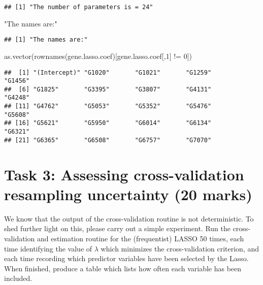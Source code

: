 \documentclass[
]{article}
\newenvironment{Shaded}{\begin{snugshade}}{\end{snugshade}}
\newcommand{\DecValTok}[1]{\textcolor[rgb]{0.00,0.00,0.81}{#1}}
\newcommand{\FunctionTok}[1]{\textcolor[rgb]{0.00,0.00,0.00}{#1}}
\newcommand{\NormalTok}[1]{#1}
\newcommand{\SpecialCharTok}[1]{\textcolor[rgb]{0.00,0.00,0.00}{#1}}
\newcommand{\StringTok}[1]{\textcolor[rgb]{0.31,0.60,0.02}{#1}}
\begin{document}
\begin{verbatim}
## [1] "The number of parameters is = 24"
\end{verbatim}

\begin{Shaded}
\begin{Highlighting}[]
\StringTok{"The names are:"}
\end{Highlighting}
\end{Shaded}

\begin{verbatim}
## [1] "The names are:"
\end{verbatim}

\begin{Shaded}
\begin{Highlighting}[]
\FunctionTok{as.vector}\NormalTok{(}\FunctionTok{rownames}\NormalTok{(gene.lasso.coef)[gene.lasso.coef[,}\DecValTok{1}\NormalTok{] }\SpecialCharTok{!=} \DecValTok{0}\NormalTok{])}
\end{Highlighting}
\end{Shaded}

\begin{verbatim}
##  [1] "(Intercept)" "G1020"       "G1021"       "G1259"       "G1456"      
##  [6] "G1825"       "G3395"       "G3807"       "G4131"       "G4248"      
## [11] "G4762"       "G5053"       "G5352"       "G5476"       "G5608"      
## [16] "G5621"       "G5950"       "G6014"       "G6134"       "G6321"      
## [21] "G6365"       "G6508"       "G6757"       "G7070"
\end{verbatim}

\hypertarget{task-3-assessing-cross-validation-resampling-uncertainty-20-marks}{%
\section{Task 3: Assessing cross-validation resampling uncertainty (20
marks)}\label{task-3-assessing-cross-validation-resampling-uncertainty-20-marks}}

We know that the output of the cross-validation routine is not
deterministic. To shed further light on this, please carry out a simple
experiment. Run the cross-validation and estimation routine for the
(frequentist) LASSO 50 times, each time identifying the value of
\(\lambda\) which minimizes the cross-validation criterion, and each
time recording which predictor variables have been selected by the
Lasso. When finished, produce a table which lists how often each
variable has been included.
\end{document}
